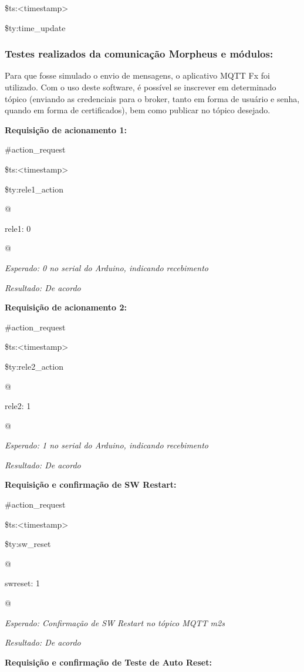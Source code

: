 \$ts:\textless timestamp\textgreater

\$ty:time\_update

\subsubsection{Testes realizados da comunicação Morpheus e módulos:}

Para que fosse simulado o envio de mensagens, o aplicativo MQTT Fx foi utilizado. Com o uso deste software, é possível se inscrever em determinado tópico (enviando as credenciais para o broker, tanto em forma de usuário e senha, quando em forma de certificados), bem como publicar no tópico desejado.

\textbf{Requisição de acionamento 1:}

\#action\_request

\$ts:\textless timestamp\textgreater

\$ty:rele1\_action

@

rele1: 0

@

\textit{Esperado: 0 no serial do Arduino, indicando recebimento}

\textit{Resultado: De acordo}

\textbf{Requisição de acionamento 2:}

\#action\_request

\$ts:\textless timestamp\textgreater

\$ty:rele2\_action

@

rele2: 1

@

\textit{Esperado: 1 no serial do Arduino, indicando recebimento}

\textit{Resultado: De acordo}

\textbf{Requisição e confirmação de SW Restart:}

\#action\_request

\$ts:\textless timestamp\textgreater

\$ty:sw\_reset

@

swreset: 1

@

\textit{Esperado: Confirmação de SW Restart no tópico MQTT m2s}

\textit{Resultado: De acordo}

\textbf{Requisição e confirmação de Teste de Auto Reset:}

